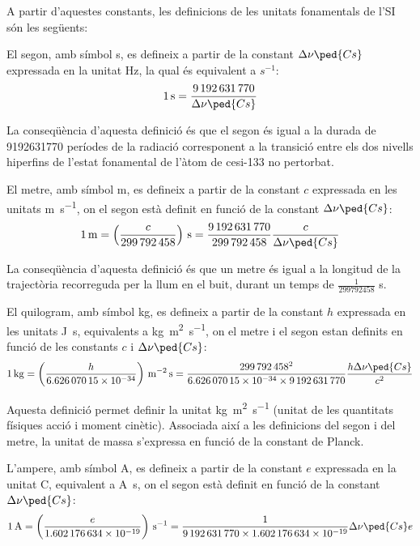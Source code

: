A partir d'aquestes constants, les definicions de les unitats fonamentals de l'SI són les següents:
\begin{list}{}
   {\setlength{\labelwidth}{22mm} \setlength{\leftmargin}{22mm} \setlength{\labelsep}{2mm}}
   \item[\textbf{segon}] El segon, amb símbol s, es defineix a partir de la constant $\Delta\nu\ped{Cs}$ expressada en la unitat Hz, la qual és equivalent a $\unit{s^{-1}}$:
       \[
            \qty{1}{s} = \frac{\num{9192631770}}{\Delta\nu\ped{Cs}}
       \]

    La conseqüència d'aquesta definició és que el segon és igual a la durada de \num{9192631770} períodes de la
   radiació corresponent a la transició entre els dos nivells
  hiperfins de l'estat fonamental de l'àtom de cesi-133 no pertorbat.

   \item[\textbf{metre}]  El metre, amb símbol m, es defineix a partir de la constant $c$ expressada en les unitats \unit{m.s^{-1}}, on el segon està definit en funció de la constant  $\Delta\nu\ped{Cs}$:
       \[
            \qty{1}{m} = \left(\frac{c}{\num{299792458}}\right)\unit{\,s} = \frac{\num{9192631770}}{\num{299792458}}\frac{c}{\Delta\nu\ped{Cs}}
       \]

    La conseqüència d'aquesta definició és que un metre és igual a la longitud de la trajectòria recorreguda per la llum
   en el buit, durant un temps de $\frac{1}{\num{299792458}}$ s.

   \item[\textbf{quilogram}] El quilogram, amb símbol kg, es defineix a partir de la constant $h$ expressada en les unitats \unit{J.s}, equivalents a \unit{kg.m^2.s^{-1}}, on el metre i el segon estan definits en funció de les constants $c$ i $\Delta\nu\ped{Cs}$:
       \[
            \qty{1}{kg} = \left(\frac{h}{\num{6,62607015 e-34}}\right)\unit{\,m^{-2}.s} = \frac{\num{299792458}^2}{\num{6,62607015 e-34}\times\num{9192631770}}\frac{h\Delta\nu\ped{Cs}}{c^2}
       \]

   Aquesta definició permet definir la unitat \unit{kg.m^2.s^{-1}} (unitat de les quantitats físiques acció i moment cinètic). Associada així a les definicions del segon i del metre,  la unitat de massa s'expressa en funció  de la constant de Planck.


   \item[\textbf{ampere}] L'ampere, amb símbol A, es defineix a partir de la constant $e$ expressada en la unitat C,  equivalent a \unit{A.s}, on el segon està definit en funció de la constant  $\Delta\nu\ped{Cs}$:
       \[
            \qty{1}{A} = \left(\frac{e}{\num{1,602176634 e-19}}\right)\unit{\,s^{-1}} = \frac{1}{\num{9192631770}\times\num{1,602176634 e-19}} \Delta\nu\ped{Cs} e
       \]


\end{list}
